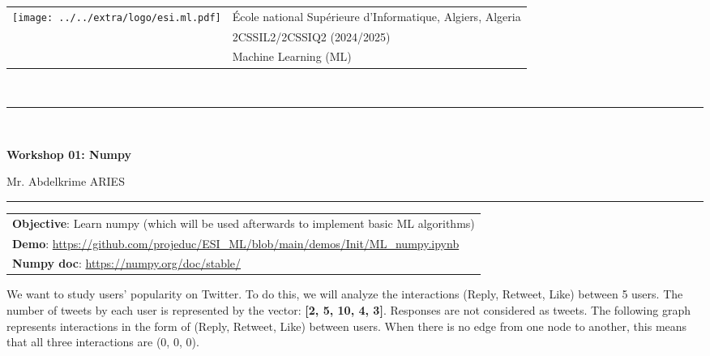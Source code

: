 \documentclass[11pt, a4paper]{article}
\begin{document}
\noindent
\begin{tabular}{ll}
\multirow{3}{*}{\texttt{[image: ../../extra/logo/esi.ml.pdf]}} & \'Ecole national Supérieure d'Informatique, Algiers, Algeria\\
& 2CSSIL2/2CSSIQ2 (2024/2025)\\
& Machine Learning (ML)
\end{tabular}\\[.25cm]
\noindent\rule{\textwidth}{1pt}\\[-0.5cm]
\begin{center}
{\LARGE \textbf{Workshop 01: Numpy}}
\begin{flushright}
	Mr. Abdelkrime ARIES
\end{flushright}
\end{center}\vspace{-.25cm}
\noindent\rule{\textwidth}{1pt}

\noindent
\begin{tabular}{|p{\textwidth}|}
	\hline
	\textbf{Objective}: Learn numpy (which will be used afterwards to implement basic ML algorithms) \\
	\textbf{Demo}: \url{https://github.com/projeduc/ESI_ML/blob/main/demos/Init/ML_numpy.ipynb} \\
	\textbf{Numpy doc}: \url{https://numpy.org/doc/stable/} \\
	\hline
\end{tabular}

We want to study users' popularity on Twitter.
To do this, we will analyze the interactions (Reply, Retweet, Like) between 5 users.
The number of tweets by each user is represented by the vector: \textbf{[2, 5, 10, 4, 3]}.
Responses are not considered as tweets.
The following graph represents interactions in the form of (Reply, Retweet, Like) between users.
When there is no edge from one node to another, this means that all three interactions are (0, 0, 0).
\end{document}

